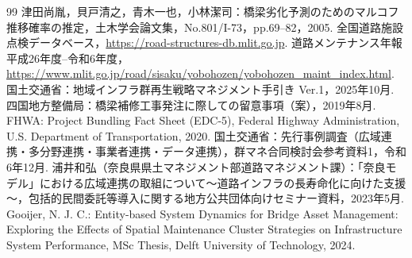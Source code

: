 \documentclass[Journal,letterpaper,InsideFigs,NoLineNumbers]{ascelike-new}
\begin{document}
\begin{thebibliography}{99}
津田尚胤，貝戸清之，青木一也，小林潔司：橋梁劣化予測のためのマルコフ推移確率の推定，土木学会論文集，No.801/I-73，pp.69--82，2005.
全国道路施設点検データベース，\url{https://road-structures-db.mlit.go.jp}.
道路メンテナンス年報 平成26年度--令和6年度，\url{https://www.mlit.go.jp/road/sisaku/yobohozen/yobohozen_maint_index.html}.
国土交通省：地域インフラ群再生戦略マネジメント手引き Ver.1，2025年10月.
四国地方整備局：橋梁補修工事発注に際しての留意事項（案），2019年8月.
FHWA: Project Bundling Fact Sheet (EDC-5), Federal Highway Administration, U.S. Department of Transportation, 2020.
国土交通省：先行事例調査（広域連携・多分野連携・事業者連携・データ連携），群マネ合同検討会参考資料1，令和6年12月.
浦井和弘（奈良県県土マネジメント部道路マネジメント課）：「奈良モデル」における広域連携の取組について～道路インフラの長寿命化に向けた支援～，包括的民間委託等導入に関する地方公共団体向けセミナー資料，2023年5月.
Gooijer, N. J. C.: Entity-based System Dynamics for Bridge Asset Management: Exploring the Effects of Spatial Maintenance Cluster Strategies on Infrastructure System Performance, MSc Thesis, Delft University of Technology, 2024.
\end{thebibliography}
\end{document}
